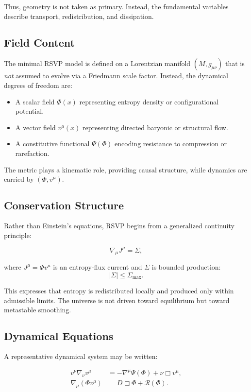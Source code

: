\documentclass[12pt]{article}
\begin{document}
Thus, geometry is not taken as primary. Instead, the fundamental variables describe transport, redistribution, and dissipation.

\subsection{Field Content}

The minimal RSVP model is defined on a Lorentzian manifold $(M,g_{\mu\nu})$ that is \emph{not} assumed to evolve via a Friedmann scale factor. Instead, the dynamical degrees of freedom are:

\begin{itemize}
\item A scalar field $\Phi(x)$ representing entropy density or configurational potential.
\item A vector field $v^\mu(x)$ representing directed baryonic or structural flow.
\item A constitutive functional $\Psi(\Phi)$ encoding resistance to compression or rarefaction.
\end{itemize}

The metric plays a kinematic role, providing causal structure, while dynamics are carried by $(\Phi, v^\mu)$.

\subsection{Conservation Structure}

Rather than Einstein's equations, RSVP begins from a generalized continuity principle:

\begin{equation}
\nabla_\mu J^\mu = \Sigma,
\end{equation}

where $J^\mu = \Phi v^\mu$ is an entropy-flux current and $\Sigma$ is bounded production:
\[
|\Sigma| \le \Sigma_{\max}.
\]

This expresses that entropy is redistributed locally and produced only within admissible limits. The universe is not driven toward equilibrium but toward metastable smoothing.

\subsection{Dynamical Equations}

A representative dynamical system may be written:

\begin{align}
v^\nu \nabla_\nu v^\mu &= -\nabla^\mu \Psi(\Phi) + \nu \Box v^\mu, \\
\nabla_\mu(\Phi v^\mu) &= D \Box \Phi + \mathcal{R}(\Phi).
\end{align}
\end{document}
